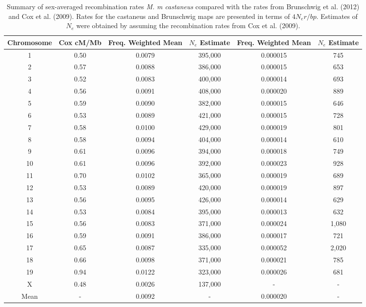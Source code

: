 
\begin{sidewaystable}
\caption[Summary of recombination rates per chromosomes]{Summary of sex-averaged recombination rates \emph{M. m castaneus} compared with the rates from Brunschwig et al. (2012) and Cox et al. (2009). Rates for the castaneus and Brunschwig maps are presented in terms of $4N_{e}r/bp$. Estimates of $N_e$ were obtained by assuming the recombination rates from Cox et al. (2009).}
 \begin{tabular}{c c c c c c} 
  \hline
 Chromosome & Cox cM/Mb & Freq. Weighted Mean & $N_e$ Estimate & Freq. Weighted Mean & $N_e$ Estimate \\ [0.5ex] 

 \hline
 1 & 0.50 & 0.0079 & 395,000 & 0.000015 & 745\\
 2 & 0.57 & 0.0088 & 386,000 & 0.000015 & 653\\
 3 & 0.52 & 0.0083 & 400,000 & 0.000014 & 693\\
 4 & 0.56 & 0.0091 & 408,000 & 0.000020 & 889\\
 5 & 0.59 & 0.0090 & 382,000 & 0.000015 & 646\\
 6 & 0.53 & 0.0089 & 421,000 & 0.000015 & 728\\
 7 & 0.58 & 0.0100 & 429,000 & 0.000019 & 801\\
 8 & 0.58 & 0.0094 & 404,000 & 0.000014 & 610\\
 9 & 0.61 & 0.0096 & 394,000 & 0.000018 & 749\\
 10 & 0.61 & 0.0096 & 392,000 & 0.000023 & 928\\
 11 & 0.70 & 0.0102 & 365,000 & 0.000019 & 689\\
 12 & 0.53 & 0.0089 & 420,000 & 0.000019 & 897\\
 13 & 0.56 & 0.0095 & 426,000 & 0.000014 & 629\\
 14 & 0.53 & 0.0084 & 395,000 & 0.000013 & 632\\
 15 & 0.56 & 0.0083 & 371,000 & 0.000024 & 1,080\\
 16 & 0.59 & 0.0091 & 386,000 & 0.000017 & 721\\
 17 & 0.65 & 0.0087 & 335,000 & 0.000052 & 2,020\\
 18 & 0.66 & 0.0098 & 371,000 & 0.000021 & 785\\
 19 & 0.94 & 0.0122 & 323,000 & 0.000026 & 681\\
 X & 0.48 & 0.0026 & 137,000 & - & -\\
 Mean & - & 0.0092 & - & 0.000020 &  -\\[1ex] 
 \hline
\end{tabular}    

\end{sidewaystable}

